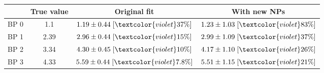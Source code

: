\begin{tabular}{c||c|c|c}
 & True value & Original fit & With new NPs\\
\hline\hline
BP 0 & 1.1 & $1.19\pm0.44\;[\textcolor{violet}{37\%}]$ & $1.23\pm1.03\;[\textcolor{violet}{83\%}]$\\\hline
BP 1 & 2.39 & $2.96\pm0.44\;[\textcolor{violet}{15\%}]$ & $2.99\pm1.09\;[\textcolor{violet}{37\%}]$\\\hline
BP 2 & 3.34 & $4.30\pm0.45\;[\textcolor{violet}{10\%}]$ & $4.17\pm1.10\;[\textcolor{violet}{26\%}]$\\\hline
BP 3 & 4.33 & $5.59\pm0.44\;[\textcolor{violet}{7.8\%}]$ & $5.51\pm1.15\;[\textcolor{violet}{21\%}]$\\
\end{tabular}
